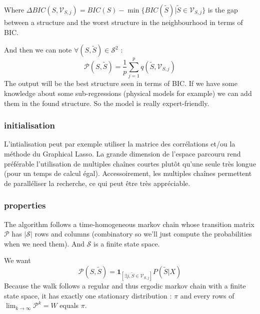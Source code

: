 \documentclass[12pt]{article}
\begin{document}
	Where $\Delta BIC(S,\mathcal{V}_{S,j})=BIC(S)-\min\{BIC(\tilde{S})| \tilde{S} \in \mathcal{V}_{S,j} \} $ is the gap between a structure and the worst structure in the neighbourhood in terms of BIC.
	\newline
	
	 And then we can note $\forall (S,\tilde{S}) \in \mathcal{S}^2 $ :
		\begin{displaymath}
			\mathcal{P}(S,\tilde{S})= \frac{1}{p} \sum_{j=1}^p q(\tilde{S},\mathcal{V}_{S,j})
		\end{displaymath}
	The output will be the best structure seen in terms of BIC. If we have some knowledge about some sub-regressions (physical models for example) we can add them in the found structure. So the model is really expert-friendly.



 \subsubsection{initialisation}
L'intialisation peut par exemple utiliser la matrice des corr\'elations et/ou la m\'ethode du Graphical Lasso\cite{friedman2008sparse}.		
La grande dimension de l'espace parcouru rend pr\'ef\'erable l'utilisation de multiples chaînes courtes plutôt qu'une seule très longue (pour un temps de calcul \'egal). Accessoirement, les multiples chaînes permettent de parall\'eliser la recherche, ce qui peut être très appr\'eciable.


	\subsubsection{properties}
	The algorithm follows a time-homogeneous markov chain whose transition matrix $\mathcal{P}$ has $|\mathcal{S}|$ rows and columns (combinatory so we'll just compute the probabilities when we need them).
	And $\mathcal{S}$ is a finite state space.%
	
We want 
		\begin{equation}
			\mathcal{P}(S,\tilde{S})=\mathbf{1}_{[\exists j, \tilde{S} \in \mathcal{V}_{S,j} ]} P(\tilde{S}|X)
		\end{equation}
			Because the walk follows a regular and thus ergodic markov chain with a finite state space, it has exactly one stationary distribution \cite{grinstead1997introduction} : $\pi$ and every rows of $\operatorname{lim}_{k\rightarrow \infty}\mathcal{P}^k=W$ equals $\pi$.
\end{document}
